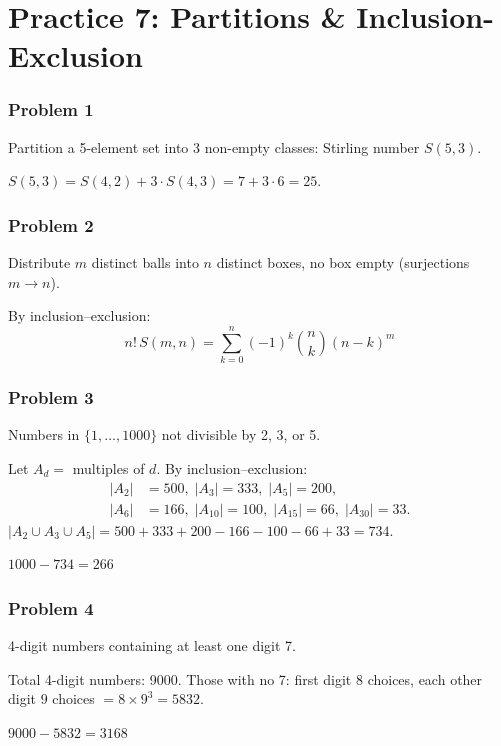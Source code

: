 
\section*{Practice 7: Partitions \& Inclusion-Exclusion}

\subsubsection*{Problem 1}
Partition a 5-element set into 3 non-empty classes: Stirling number $S(5,3)$.

$S(5,3) = S(4,2)+3\cdot S(4,3) = 7 + 3\cdot 6 = \boxed{25}$.

\subsubsection*{Problem 2}
Distribute $m$ distinct balls into $n$ distinct boxes, no box empty (surjections $m\to n$).

By inclusion--exclusion:
\[
  \boxed{n!\,S(m,n) = \sum_{k=0}^{n}(-1)^k\binom{n}{k}(n-k)^m}
\]

\subsubsection*{Problem 3}
Numbers in $\{1,\dots,1000\}$ not divisible by 2, 3, or 5.

Let $A_d = $ multiples of $d$. By inclusion--exclusion:
\begin{align*}
|A_2|&=500,\; |A_3|=333,\; |A_5|=200,\\
|A_6|&=166,\; |A_{10}|=100,\; |A_{15}|=66,\; |A_{30}|=33.
\end{align*}
$|A_2\cup A_3\cup A_5|=500+333+200-166-100-66+33=734$.

$\boxed{1000-734=266}$

\subsubsection*{Problem 4}
4-digit numbers containing at least one digit 7.

Total 4-digit numbers: 9000. Those with no 7: first digit $8$ choices, each other digit $9$ choices $= 8\times 9^3 = 5832$.

$\boxed{9000-5832=3168}$

